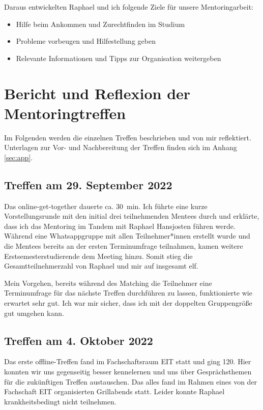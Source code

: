 \documentclass[
    paper=A4,
    div=calc,
    numbers=noendperiod
]{scrartcl}
\begin{document}
    Daraus entwickelten Raphael und ich folgende Ziele für unsere Mentoringarbeit:
    \begin{itemize}
        \item Hilfe beim Ankommen und Zurechtfinden im Studium
        \item Probleme vorbeugen und Hilfestellung geben
        \item Relevante Informationen und Tipps zur Organisation weitergeben
    \end{itemize}

\section{Bericht und Reflexion der Mentoringtreffen}
    Im Folgenden werden die einzelnen Treffen beschrieben und von mir reflektiert. Unterlagen zur Vor- und Nachbereitung der Treffen finden sich im Anhang \ref{sec:app}. 

\subsection{Treffen am 29. September 2022}
    Das online-get-together dauerte ca. \SI{30}{\minute}. Ich führte eine kurze Vorstellungsrunde mit den initial drei teilnehmenden Mentees durch und erklärte, dass ich das Mentoring im Tandem mit Raphael Hansjosten führen werde. Während eine Whatsappgruppe mit allen Teilnehmer*innen erstellt wurde und die Mentees bereits an der ersten Terminumfrage teilnahmen, kamen weitere Erstsemesterstudierende dem Meeting hinzu. Somit stieg die Gesamtteilnehmerzahl von Raphael und mir auf insgesamt elf.

    Mein Vorgehen, bereits während des Matching die Teilnehmer eine Terminumfrage für das nächste Treffen durchführen zu lassen, funktionierte wie erwartet sehr gut. Ich war mir sicher, dass ich mit der doppelten Gruppengröße gut umgehen kann.

\subsection{Treffen am 4. Oktober 2022}
    Das erste offline-Treffen fand im Fachschaftsraum EIT statt und ging \SI{120}{\min}. Hier konnten wir uns gegenseitig besser kennelernen und uns über Gesprächsthemen für die zukünftigen Treffen austauschen. Das alles fand im Rahmen eines von der Fachschaft EIT organisierten Grillabends statt. Leider konnte Raphael krankheitsbedingt nicht teilnehmen.
\end{document}

